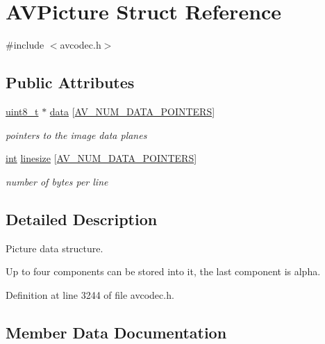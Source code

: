 \hypertarget{struct_a_v_picture}{}\section{A\+V\+Picture Struct Reference}
\label{struct_a_v_picture}


{\ttfamily \#include $<$avcodec.\+h$>$}

\subsection*{Public Attributes}
\begin{DoxyCompactItemize}
\item 
\hyperlink{lib-src_2ffmpeg_2win32_2stdint_8h_a9a941819355e6f658991890ff66b4b0e}{uint8\+\_\+t} $\ast$ \hyperlink{struct_a_v_picture_a7d4879fa3ea09329981c9bdf4d5e077c}{data} \mbox{[}\hyperlink{ffmpeg_2libavutil_2frame_8h_add80189702cf0f5ea82718576fb43201}{A\+V\+\_\+\+N\+U\+M\+\_\+\+D\+A\+T\+A\+\_\+\+P\+O\+I\+N\+T\+E\+RS}\mbox{]}
\begin{DoxyCompactList}\small\item\em pointers to the image data planes \end{DoxyCompactList}\item 
\hyperlink{xmltok_8h_a5a0d4a5641ce434f1d23533f2b2e6653}{int} \hyperlink{struct_a_v_picture_a51b07f91c0ca87b6b4b63f298c8ce34c}{linesize} \mbox{[}\hyperlink{ffmpeg_2libavutil_2frame_8h_add80189702cf0f5ea82718576fb43201}{A\+V\+\_\+\+N\+U\+M\+\_\+\+D\+A\+T\+A\+\_\+\+P\+O\+I\+N\+T\+E\+RS}\mbox{]}
\begin{DoxyCompactList}\small\item\em number of bytes per line \end{DoxyCompactList}\end{DoxyCompactItemize}


\subsection{Detailed Description}
Picture data structure.

Up to four components can be stored into it, the last component is alpha. 

Definition at line 3244 of file avcodec.\+h.



\subsection{Member Data Documentation}
